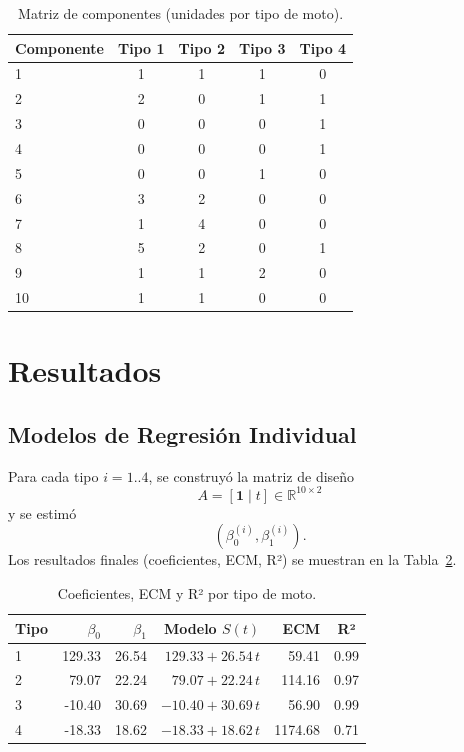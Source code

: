 \documentclass[12pt,a4paper]{article}
\newcommand{\tablesmall}{\scriptsize}
\begin{document}
\begin{table}[H]
\tablesmall
\centering
\caption{Matriz de componentes (unidades por tipo de moto).}
\label{tab:componentes_definicion}
\begin{tabular}{@{}lcccc@{}}
\toprule
Componente   & Tipo 1 & Tipo 2 & Tipo 3 & Tipo 4 \\ \midrule
1  & 1 & 1 & 1 & 0 \\
2  & 2 & 0 & 1 & 1 \\
3  & 0 & 0 & 0 & 1 \\
4  & 0 & 0 & 0 & 1 \\
5  & 0 & 0 & 1 & 0 \\
6  & 3 & 2 & 0 & 0 \\
7  & 1 & 4 & 0 & 0 \\
8  & 5 & 2 & 0 & 1 \\
9  & 1 & 1 & 2 & 0 \\
10 & 1 & 1 & 0 & 0 \\ \bottomrule
\end{tabular}
\end{table}

\section{Resultados}

\subsection{Modelos de Regresión Individual}
Para cada tipo $i=1..4$, se construyó la matriz de diseño 
\[
A = [\mathbf{1}\;|\;t] \in \mathbb{R}^{10\times2}
\]
y se estimó
\[
(\beta_0^{(i)},\beta_1^{(i)}).
\]
Los resultados finales (coeficientes, ECM, R²) se muestran en la Tabla~\ref{tab:coeficientes_ecm_r2}.

\begin{table}[H]
\tablesmall
\centering
\caption{Coeficientes, ECM y R² por tipo de moto.}
\label{tab:coeficientes_ecm_r2}
\begin{tabular}{@{}lrrrrc@{}}
\toprule
Tipo & $\beta_0$ & $\beta_1$ & Modelo $S(t)$                   & ECM     & R²   \\ \midrule
1 & 129.33 & 26.54 & $129.33 + 26.54\,t$ & 59.41   & 0.99 \\
2 & 79.07  & 22.24 & $79.07 + 22.24\,t$  & 114.16  & 0.97 \\
3 & -10.40 & 30.69 & $-10.40 + 30.69\,t$ & 56.90   & 0.99 \\
4 & -18.33 & 18.62 & $-18.33 + 18.62\,t$ & 1174.68 & 0.71 \\ \bottomrule
\end{tabular}
\end{table}
\end{document}
